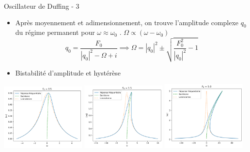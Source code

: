 \begin{frame}{Oscillateur de Duffing - 3}
  \begin{itemize}
    \item Après moyennement et adimensionnement, on trouve l'amplitude complexe $q_0$ du régime permanent pour $\omega \approx \omega_0$ \cite{pistolesi_duffing_nodate}. $\Omega \propto (\omega-\omega_0)$
        $$  q_0 = \frac{F_0}{|q_0|^2 - \Omega + i} \implies \Omega = |q_0|^2 \pm \sqrt{\frac{F_0^2}{|q_0|^2} - 1 } $$
    \item Bistabilité d'amplitude et hystérèse \cite{landau_mechanics_1976}
  \end{itemize}
    \includegraphics[width=0.32\textwidth]{images/duffing/F0=0.5.png}
    \includegraphics[width=0.32\textwidth]{images/duffing/F0=1.5.png}
    \includegraphics[width=0.32\textwidth]{images/duffing/F0=5.0.png}
\end{frame}

